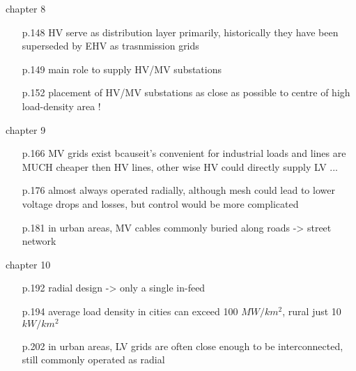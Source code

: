 \documentclass[paper=a4, fontsize=12pt]{article}
\begin{document}
chapter 8
\begin{itemize}
\item[p.148] HV serve as distribution layer primarily, historically they have been superseded by EHV as trasnmission grids
\item[p.149] main role to supply HV/MV substations
\item[p.152] placement of HV/MV substations as close as possible to centre of high load-density area !
\end{itemize}

chapter 9

\begin{itemize}
\item[p.166] MV grids exist bcauseit's convenient for industrial loads and lines are MUCH cheaper then HV lines, other wise HV could directly supply LV ...
\item[p.176] almost always operated radially, although mesh could lead to lower voltage drops and losses, but control would be more complicated
\item[p.181] in urban areas, MV cables commonly buried along roads -> street network
\end{itemize}

chapter 10

\begin{itemize}
\item[p.192] radial design -> only a single in-feed
\item[p.194] average load density in cities can exceed 100 $MW/km^2$, rural just 10 $kW/km^2$
\item[p.202] in urban areas, LV grids are often close enough to be interconnected, still commonly operated as radial
\end{itemize}






\end{document}

